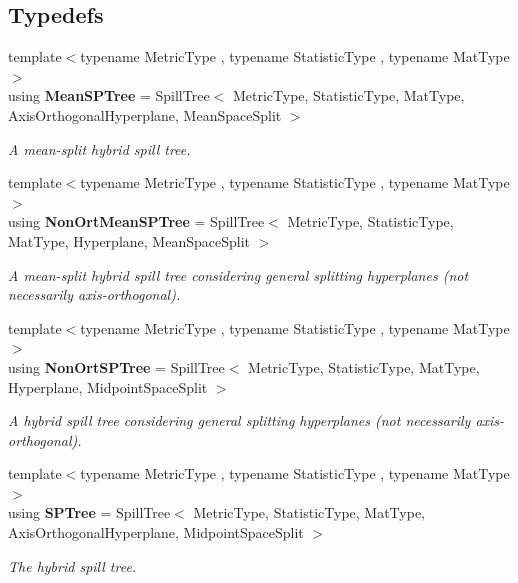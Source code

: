 \subsection*{Typedefs}
\begin{DoxyCompactItemize}
\item 
{\footnotesize template$<$typename Metric\+Type , typename Statistic\+Type , typename Mat\+Type $>$ }\\using \textbf{ Mean\+S\+P\+Tree} = Spill\+Tree$<$ Metric\+Type, Statistic\+Type, Mat\+Type, Axis\+Orthogonal\+Hyperplane, Mean\+Space\+Split $>$
\begin{DoxyCompactList}\small\item\em A mean-\/split hybrid spill tree. \end{DoxyCompactList}\item 
{\footnotesize template$<$typename Metric\+Type , typename Statistic\+Type , typename Mat\+Type $>$ }\\using \textbf{ Non\+Ort\+Mean\+S\+P\+Tree} = Spill\+Tree$<$ Metric\+Type, Statistic\+Type, Mat\+Type, Hyperplane, Mean\+Space\+Split $>$
\begin{DoxyCompactList}\small\item\em A mean-\/split hybrid spill tree considering general splitting hyperplanes (not necessarily axis-\/orthogonal). \end{DoxyCompactList}\item 
{\footnotesize template$<$typename Metric\+Type , typename Statistic\+Type , typename Mat\+Type $>$ }\\using \textbf{ Non\+Ort\+S\+P\+Tree} = Spill\+Tree$<$ Metric\+Type, Statistic\+Type, Mat\+Type, Hyperplane, Midpoint\+Space\+Split $>$
\begin{DoxyCompactList}\small\item\em A hybrid spill tree considering general splitting hyperplanes (not necessarily axis-\/orthogonal). \end{DoxyCompactList}\item 
{\footnotesize template$<$typename Metric\+Type , typename Statistic\+Type , typename Mat\+Type $>$ }\\using \textbf{ S\+P\+Tree} = Spill\+Tree$<$ Metric\+Type, Statistic\+Type, Mat\+Type, Axis\+Orthogonal\+Hyperplane, Midpoint\+Space\+Split $>$
\begin{DoxyCompactList}\small\item\em The hybrid spill tree. \end{DoxyCompactList}\end{DoxyCompactItemize}


